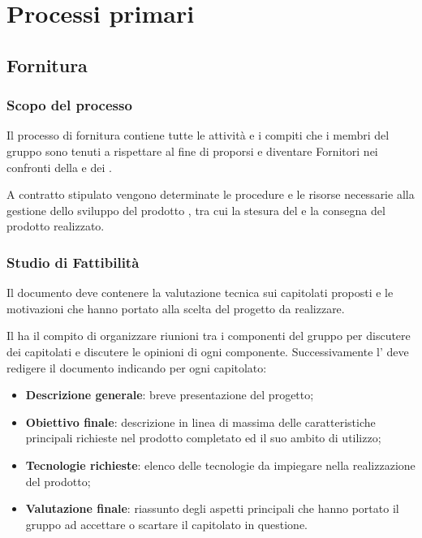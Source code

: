 \section{Processi primari}

	\subsection{Fornitura} \label{fornitura}

		\subsubsection{Scopo del processo}

			Il processo di fornitura contiene tutte le attività e i compiti che i membri del gruppo
			\GroupName{} sono tenuti a rispettare al fine di proporsi e diventare Fornitori nei confronti
			della  \Proponente{} e dei  \Committenteinriga{}.

			A contratto stipulato vengono determinate le procedure e le risorse necessarie alla gestione dello sviluppo
			del prodotto \ProjectName{}, tra cui la stesura del \vPianoDiProgetto{} e la consegna del prodotto realizzato.
	
		\subsubsection{Studio di Fattibilità}

			Il documento \vStudioDiFattibilita{} deve contenere la valutazione tecnica sui capitolati proposti
			e le motivazioni che hanno portato alla scelta del progetto da realizzare.

			Il \Responsabile{} ha il compito di organizzare riunioni tra i componenti del gruppo per discutere dei capitolati
			e discutere le opinioni di ogni componente.
			Successivamente l'\Analista{} deve redigere il documento indicando per ogni capitolato:

			\begin{itemize}
				\item \textbf{Descrizione generale}: breve presentazione del progetto;
				\item \textbf{Obiettivo finale}: descrizione in linea di massima delle caratteristiche principali richieste nel prodotto
					completato ed il suo ambito di utilizzo;
				\item \textbf{Tecnologie richieste}: elenco delle tecnologie da impiegare nella realizzazione del prodotto;
				\item \textbf{Valutazione finale}: riassunto degli aspetti principali che hanno portato il gruppo ad accettare o scartare
					il capitolato in questione.
			\end{itemize}

